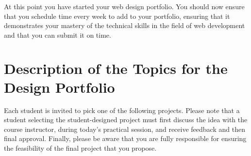 \documentclass[11pt]{article}
\begin{document}
At this point you have started your web design portfolio. You should now ensure
that you schedule time every week to add to your portfolio, ensuring that it
demonstrates your mastery of the technical skills in the field of web
development and that you can submit it on time.

\section*{Description of the Topics for the Design Portfolio}

Each student is invited to pick one of the following projects. Please note that
a student selecting the student-designed project must first discuss the idea
with the course instructor, during today's practical session, and receive
feedback and then final approval. Finally, please be aware that you are fully
responsible for ensuring the feasibility of the final project that you propose.
\end{document}
